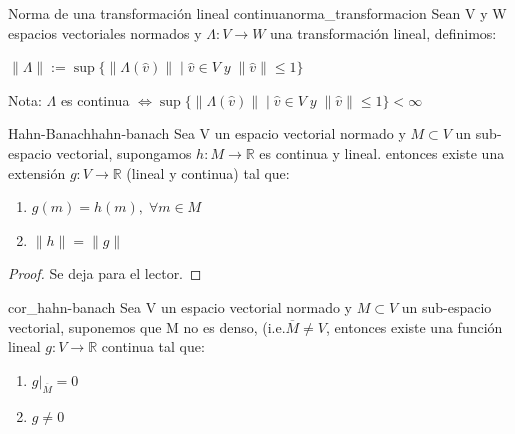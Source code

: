 \documentclass[12pt,a4paper]{book}
\providecommand{\norm}[1]{\lVert#1\rVert}
\begin{document}
\begin{definicion}{Norma de una transformación lineal continua}{norma_transformacion}
Sean V y W espacios vectoriales normados y $\Lambda :V\rightarrow W$ una transformación lineal, definimos:
\begin{center}
$\norm{\Lambda}:= \sup\lbrace \norm{\Lambda(\widehat{v})}\;|\;\widehat{v}\in V\; y \; \norm{\widehat{v}}\leq 1\rbrace$
\end{center}
Nota: $\Lambda$ es continua $\Leftrightarrow \sup\lbrace \norm{\Lambda(\widehat{v})}\;|\;\widehat{v}\in V\; y \; \norm{\widehat{v}}\leq 1\rbrace <\infty$
\end{definicion}

\smallskip

\begin{teorema}{Hahn-Banach}{hahn-banach}
Sea V un espacio vectorial normado y $M\subset V$ un sub-espacio vectorial, supongamos $h:M\rightarrow\mathbb{R}$ es continua y lineal. entonces existe una extensión $g:V\rightarrow \mathbb{R}$ (lineal y continua) tal que:
\begin{enumerate}
\item $g(m)=h(m),\;\forall m\in M$
\item $\norm{h}=\norm{g}$ 
\end{enumerate} 
\end{teorema}

\begin{proof}
Se deja para el lector.
\end{proof}

\begin{corolario}{}{cor_hahn-banach}
Sea V un espacio vectorial normado y $M\subset V$ un sub-espacio vectorial, suponemos que M no es denso, (i.e.$\overline{M}\neq V$, entonces existe una función lineal $g:V\rightarrow\mathbb{R}$ continua tal que:
\begin{enumerate}
\item $g|_{\overline{M}}=0$
\item $g\neq 0$
\end{enumerate}
\end{corolario}
\end{document}
